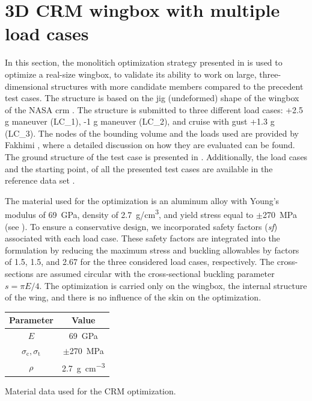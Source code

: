 \section{3D CRM wingbox with multiple load cases}
In this section, the monolitich optimization strategy presented in  is used to optimize a real-size wingbox, to validate its ability to work on large, three-dimensional structures with more candidate members compared to the precedent test cases. The structure is based on the jig (undeformed) shape of the wingbox of the NASA \gls{crm} . The structure is submitted to three different load cases: +2.5 g maneuver (LC\_1), -1 g maneuver (LC\_2), and cruise with gust +1.3 g (LC\_3). The nodes of the bounding volume and the loads used are provided by Fakhimi \etal {}, where a detailed discussion on how they are evaluated can be found. The ground structure of the test case is presented in . Additionally, the load cases and the starting point, of all the presented test cases are available in the reference data set .

The material used for the optimization is an aluminum alloy with Young's modulus of \qty{69}{\GPa}, density of \qty{2.7}{\gram/\cm^3}, and yield stress equal to $\pm$\qty{270}{\MPa} (see ). To ensure a conservative design, we incorporated safety factors (\textit{sf}) associated with each load case. These safety factors are integrated into the formulation by reducing the maximum stress and buckling allowables by factors of 1.5, 1.5, and 2.67 for the three considered load cases, respectively. The cross-sections are assumed circular with the cross-sectional buckling parameter $s = \pi E/4$. The optimization is carried only on the wingbox, the internal structure of the wing, and there is no influence of the skin on the optimization.
\begin{margintable}
    \small
    \centering
    \begin{tabular}{cc}
    \toprule
    \textbf{Parameter}        & \textbf{Value} \\ \midrule
    $E$              & \qty{69}{GPa}     \\
    $\sigma_\text{c}, \sigma_\text{t}$ & $\pm $\qty{270}{MPa} \\
    $\rho$              & \qty{2.7}{\gram\per\cubic\centi\metre}   \\
    \bottomrule
    \end{tabular}
    \caption{Material data used for the CRM optimization.}
    \label{tab:07_CRM_mat}
\end{margintable}

